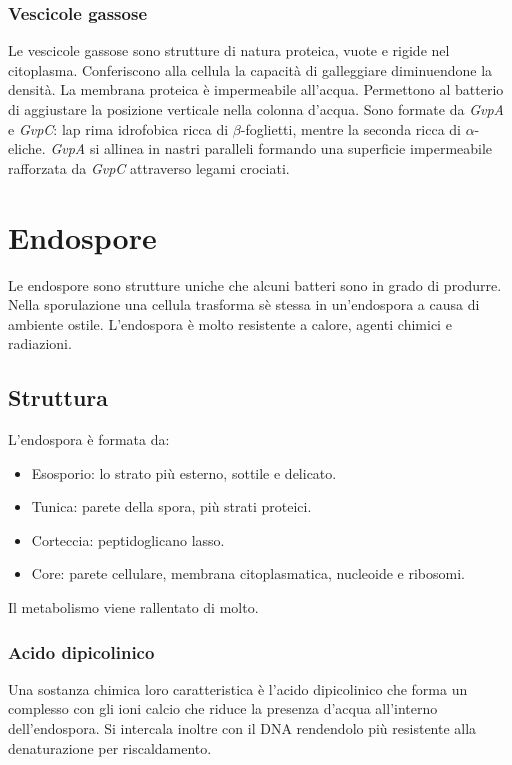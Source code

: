 		\subsubsection{Vescicole gassose}
		Le vescicole gassose sono strutture di natura proteica, vuote e rigide nel citoplasma.
		Conferiscono alla cellula la capacit\`a di galleggiare diminuendone la densit\`a.
		La membrana proteica \`e impermeabile all'acqua.
		Permettono al batterio di aggiustare la posizione verticale nella colonna d'acqua.
		Sono formate da \emph{GvpA} e \emph{GvpC}: lap rima idrofobica ricca di $\beta$-foglietti, mentre la seconda ricca di $\alpha$-eliche.
		\emph{GvpA} si allinea in nastri paralleli formando una superficie impermeabile rafforzata da \emph{GvpC} attraverso legami crociati.

\section{Endospore}
Le endospore sono strutture uniche che alcuni batteri sono in grado di produrre.
Nella sporulazione una cellula trasforma s\`e stessa in un'endospora a causa di ambiente ostile.
L'endospora \`e molto resistente a calore, agenti chimici e radiazioni.

	\subsection{Struttura}
	L'endospora \`e formata da:
	\begin{multicols}{2}
		\begin{itemize}
			\item Esosporio: lo strato pi\`u esterno, sottile e delicato.
			\item Tunica: parete della spora, pi\`u strati proteici.
			\item Corteccia: peptidoglicano lasso.
			\item Core: parete cellulare, membrana citoplasmatica, nucleoide e ribosomi.
		\end{itemize}
	\end{multicols}
	Il metabolismo viene rallentato di molto.
	
		\subsubsection{Acido dipicolinico}
		Una sostanza chimica loro caratteristica \`e l'acido dipicolinico che forma un complesso con gli ioni calcio  che riduce la presenza d'acqua all'interno dell'endospora.
		Si intercala inoltre con il DNA rendendolo pi\`u resistente alla denaturazione per riscaldamento.


